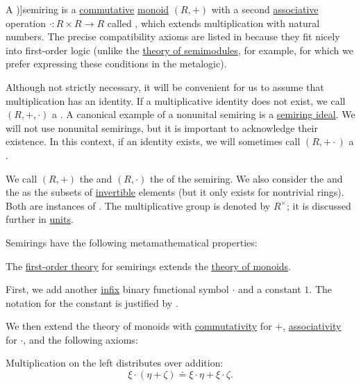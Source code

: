 \begin{definition}\label{def:semiring}
  A \term[ru=полукольцо (\cite[95]{ДудниковСамборский1991})]{semiring} is a \hyperref[def:binary_operation/commutative]{commutative} \hyperref[def:monoid]{monoid} \( (R, +) \) with a second \hyperref[def:binary_operation/associative]{associative} operation \( \cdot: R \times R \to R \) called , which extends multiplication with natural numbers. The precise compatibility axioms are listed in  because they fit nicely into first-order logic (unlike the \hyperref[def:semimodule/theory]{theory of semimodules}, for example, for which we prefer expressing these conditions in the metalogic).

  Although not strictly necessary, it will be convenient for us to assume that multiplication has an identity. If a multiplicative identity does not exist, we call \( (R, +, \cdot) \) a . A canonical example of a nonunital semiring is a \hyperref[def:semiring_ideal]{semiring ideal}. We will not use nonunital semirings, but it is important to acknowledge their existence. In this context, if an identity exists, we will sometimes call \( (R, + \cdot) \) a .

  We call \( (R, +) \) the  and \( (R, \cdot) \) the  of the semiring. We also consider the  and the  as the subsets of \hyperref[def:monoid_inverse]{invertible} elements (but it only exists for nontrivial rings). Both are instances of . The multiplicative group is denoted by \( R^\times \); it is discussed further in \hyperref[def:divisibility/unit]{units}.

  Semirings have the following metamathematical properties:
  \begin{thmenum}
     The \hyperref[def:first_order_theory]{first-order theory} for semirings extends the \hyperref[def:monoid/theory]{theory of monoids}.

    First, we add another \hyperref[rem:first_order_formula_conventions/infix]{infix} binary functional symbol \( \cdot \) and a constant \( 1 \). The notation for the constant is justified by .

    We then extend the theory of monoids with \hyperref[def:binary_operation/commutative]{commutativity} for \( + \), \hyperref[def:binary_operation/associative]{associativity} for \( \cdot \), and the following axioms:
    \begin{thmenum}
       Multiplication on the left distributes over addition:
      \begin{equation}\label{eq:def:semiring/left_distributivity}
        \xi \cdot (\eta + \zeta) \doteq \xi \cdot \eta + \xi \cdot \zeta.
      \end{equation}


\end{thmenum}
\end{thmenum}
\end{definition}
